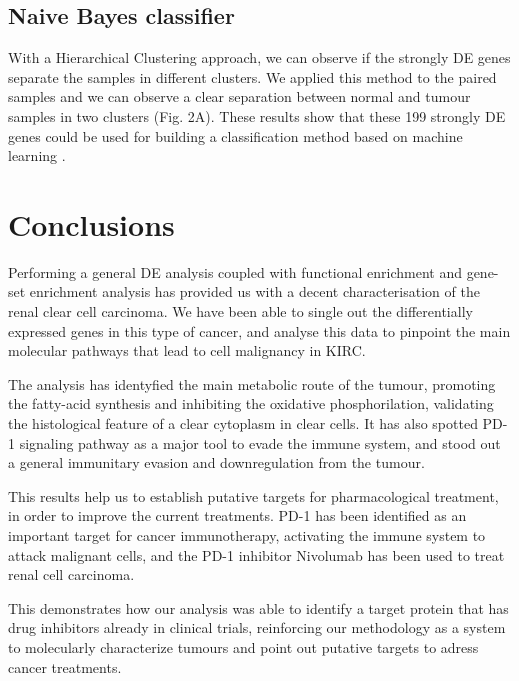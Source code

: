 \documentclass[9pt,twocolumn,twoside]{gsajnl}
\begin{document}
\subsection*{Naive Bayes classifier}
With a Hierarchical Clustering approach, we can observe if the strongly DE genes separate the samples in different clusters. We applied this method to the paired samples and we can observe a clear separation between normal and tumour samples in two clusters (Fig. 2A). These results show that these 199 strongly DE genes could be used for building a classification method based on machine learning \citep{Yang2014}. 

\section*{Conclusions}

Performing a general DE analysis coupled with functional enrichment and gene-set enrichment analysis has provided us with a decent characterisation of the renal clear cell carcinoma. We have been able to single out the differentially expressed genes in this type of cancer, and analyse this data to pinpoint the main molecular pathways that lead to cell malignancy in KIRC. 

The analysis has identyfied the main metabolic route of the tumour, promoting the fatty-acid synthesis and inhibiting the oxidative phosphorilation, validating the histological feature of a clear cytoplasm in clear cells. It has also spotted PD-1 signaling pathway as a major tool to evade the immune system, and
stood out a general immunitary evasion and downregulation from the tumour.

This results help us to establish putative targets for pharmacological treatment, in order to improve the current treatments. PD-1 has been identified as an important target for cancer immunotherapy, activating the immune system to attack malignant cells, and the PD-1 inhibitor Nivolumab \citep{nivolumab} has been used to treat renal cell carcinoma.


This demonstrates how our analysis was able to identify a target protein that has drug inhibitors already in clinical trials, reinforcing our  methodology as a system to molecularly characterize tumours and point out putative targets to adress cancer treatments.
\end{document}
